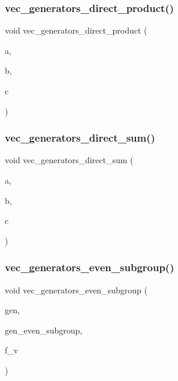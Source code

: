 \subsubsection{\texorpdfstring{vec\+\_\+generators\+\_\+direct\+\_\+product()}{vec\_generators\_direct\_product()}}
{\footnotesize\ttfamily void vec\+\_\+generators\+\_\+direct\+\_\+product (\begin{DoxyParamCaption}\item[{\mbox{\hyperlink{class_vector}{Vector}} \&}]{a,  }\item[{\mbox{\hyperlink{class_vector}{Vector}} \&}]{b,  }\item[{\mbox{\hyperlink{class_vector}{Vector}} \&}]{c }\end{DoxyParamCaption})}

\mbox{\label{perm__group__gens_8_c_a178e3d36947987c3450d143f398dd802}} 
\subsubsection{\texorpdfstring{vec\+\_\+generators\+\_\+direct\+\_\+sum()}{vec\_generators\_direct\_sum()}}
{\footnotesize\ttfamily void vec\+\_\+generators\+\_\+direct\+\_\+sum (\begin{DoxyParamCaption}\item[{\mbox{\hyperlink{class_vector}{Vector}} \&}]{a,  }\item[{\mbox{\hyperlink{class_vector}{Vector}} \&}]{b,  }\item[{\mbox{\hyperlink{class_vector}{Vector}} \&}]{c }\end{DoxyParamCaption})}

\mbox{\label{perm__group__gens_8_c_a97f04daa9d190c578504d38e10c3e0d8}} 
\subsubsection{\texorpdfstring{vec\+\_\+generators\+\_\+even\+\_\+subgroup()}{vec\_generators\_even\_subgroup()}}
{\footnotesize\ttfamily void vec\+\_\+generators\+\_\+even\+\_\+subgroup (\begin{DoxyParamCaption}\item[{\mbox{\hyperlink{class_vector}{Vector}} \&}]{gen,  }\item[{\mbox{\hyperlink{class_vector}{Vector}} \&}]{gen\+\_\+even\+\_\+subgroup,  }\item[{\mbox{\hyperlink{galois_8h_a09fddde158a3a20bd2dcadb609de11dc}{I\+NT}}}]{f\+\_\+v }\end{DoxyParamCaption})}

